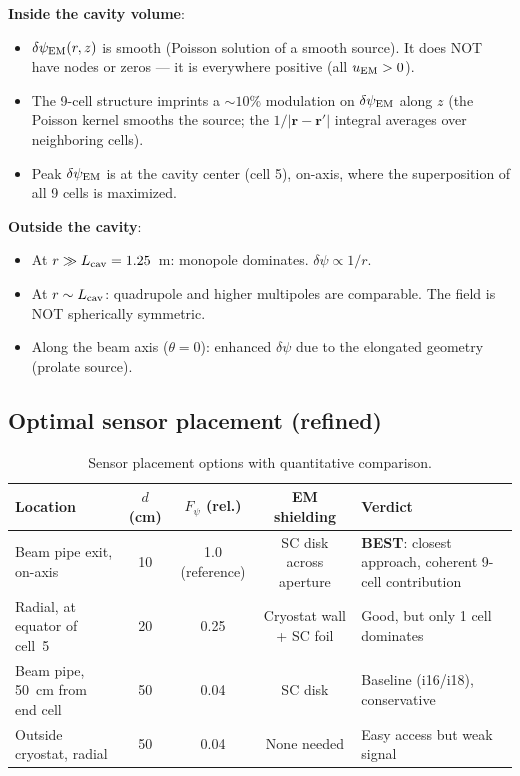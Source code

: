 \documentclass[11pt]{article}
\newcommand{\dpsi}{\delta\psi}
\theoremstyle{definition}
\theoremstyle{remark}
\begin{document}
\textbf{Inside the cavity volume}:
\begin{itemize}[nosep]
\item $\dpsi_{\rm EM}(r,z)$ is smooth (Poisson solution of a smooth
  source). It does NOT have nodes or zeros --- it is everywhere
  positive (all $u_{\rm EM} > 0$).
\item The 9-cell structure imprints a $\sim 10\%$ modulation on
  $\dpsi_{\rm EM}$ along $z$ (the Poisson kernel smooths the source;
  the $1/|\mathbf{r}-\mathbf{r}'|$ integral averages over neighboring
  cells).
\item Peak $\dpsi_{\rm EM}$ is at the cavity center (cell 5),
  on-axis, where the superposition of all 9 cells is maximized.
\end{itemize}

\textbf{Outside the cavity}:
\begin{itemize}[nosep]
\item At $r \gg L_{\rm cav} = 1.25$~m: monopole dominates.
  $\dpsi \propto 1/r$.
\item At $r \sim L_{\rm cav}$: quadrupole and higher multipoles
  are comparable. The field is NOT spherically symmetric.
\item Along the beam axis ($\theta = 0$): enhanced $\dpsi$ due
  to the elongated geometry (prolate source).
\end{itemize}

\subsection{Optimal sensor placement (refined)}

\begin{table}[H]
\centering
\caption{Sensor placement options with quantitative comparison.}
\label{tab:placement}
\renewcommand{\arraystretch}{1.3}
\begin{tabular}{@{}p{3.5cm}cccp{3.5cm}@{}}
\toprule
\textbf{Location} & \textbf{$d$ (cm)} & \textbf{$F_\psi$ (rel.)}
& \textbf{EM shielding} & \textbf{Verdict} \\
\midrule
\rowcolor{rowok}
Beam pipe exit, on-axis & 10 & 1.0 (reference) & SC disk across
  aperture & \textbf{BEST}: closest approach, coherent 9-cell
  contribution \\
\rowcolor{rowmed}
Radial, at equator of cell~5 & 20 & 0.25 & Cryostat wall
  + SC foil & Good, but only 1 cell dominates \\
\rowcolor{rowmed}
Beam pipe, 50~cm from end cell & 50 & 0.04 & SC disk
& Baseline (i16/i18), conservative \\
\rowcolor{rowhi}
Outside cryostat, radial & 50 & 0.04 & None needed
& Easy access but weak signal \\
\bottomrule
\end{tabular}
\end{table}
\end{document}
